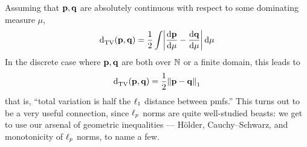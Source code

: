 Assuming that $\p,\q$ are absolutely continuous with respect to some dominating measure $\mu$,
  \begin{equation}
    \totalvardist{\p}{\q} = \frac{1}{2}\int \abs{\dv{\p}{\mu}-\dv{\q}{\mu}}\dd{\mu}
  \end{equation}
  In the discrete case where $\p,\q$ are both over $\N$ or a finite domain, this leads to
  \begin{equation}
    \label{eq:tv:l1}
    \totalvardist{\p}{\q} = \frac{1}{2}\normone{\p-\q}
  \end{equation}
  that is, ``total variation is half the $\lp[1]$ distance between pmfs.'' This turns out to be a very useful connection, since $\lp[p]$ norms are quite well-studied beasts: we get to use our arsenal of geometric inequalities --- H\"older, Cauchy--Schwarz, and monotonicity of $\lp[p]$ norms, to name a few.\smallskip

